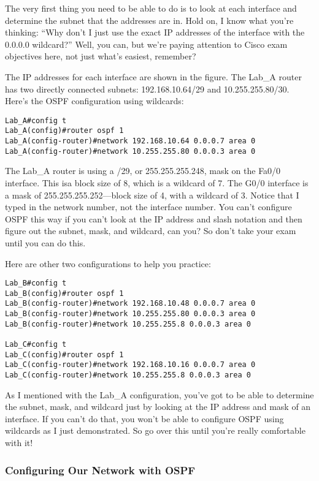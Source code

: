 The very first thing you need to be able to do is to look at each
interface and determine the subnet that the addresses are in. Hold on, I
know what you're thinking: ``Why don't I just use the exact IP addresses
of the interface with the 0.0.0.0 wildcard?'' Well, you can, but we're
paying attention to Cisco exam objectives here, not just what's easiest,
remember?

\protect\hypertarget{c18.xhtmlux5cux23Page_757}{}{}The IP addresses for
each interface are shown in the figure. The Lab\_A router has two
directly connected subnets: 192.168.10.64/29 and 10.255.255.80/30.
Here's the OSPF configuration using wildcards:

\begin{verbatim}
Lab_A#config t
Lab_A(config)#router ospf 1
Lab_A(config-router)#network 192.168.10.64 0.0.0.7 area 0
Lab_A(config-router)#network 10.255.255.80 0.0.0.3 area 0
\end{verbatim}

The Lab\_A router is using a /29, or 255.255.255.248, mask on the Fa0/0
interface. This isa block size of 8, which is a wildcard of 7. The G0/0
interface is a mask of 255.255.255.252---block size of 4, with a
wildcard of 3. Notice that I typed in the network number, not the
interface number. You can't configure OSPF this way if you can't look at
the IP address and slash notation and then figure out the subnet, mask,
and wildcard, can you? So don't take your exam until you can do this.

Here are other two configurations to help you practice:

\begin{verbatim}
Lab_B#config t
Lab_B(config)#router ospf 1
Lab_B(config-router)#network 192.168.10.48 0.0.0.7 area 0
Lab_B(config-router)#network 10.255.255.80 0.0.0.3 area 0
Lab_B(config-router)#network 10.255.255.8 0.0.0.3 area 0
 
Lab_C#config t
Lab_C(config)#router ospf 1
Lab_C(config-router)#network 192.168.10.16 0.0.0.7 area 0
Lab_C(config-router)#network 10.255.255.8 0.0.0.3 area 0
\end{verbatim}

As I mentioned with the Lab\_A configuration, you've got to be able to
determine the subnet, mask, and wildcard just by looking at the IP
address and mask of an interface. If you can't do that, you won't be
able to configure OSPF using wildcards as I just demonstrated. So go
over this until you're really comfortable with it!

\subsubsection[Configuring Our Network with
OSPF]{\texorpdfstring{\protect\hypertarget{c18.xhtmlux5cux23c18-sec-8}{}{}Configuring
Our Network with OSPF}{Configuring Our Network with OSPF}}

